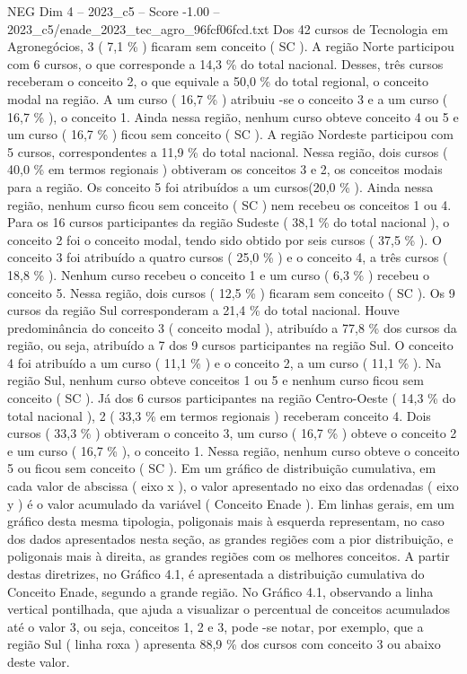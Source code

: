 \begin{textsample}{NEG Dim 4 – 2023\_c5 – Score -1.00 – 2023\_c5/enade\_2023\_tec\_agro\_96fcf06fcd.txt}
Dos 42 cursos de Tecnologia em Agronegócios, 3 ( 7,1 \% ) ficaram sem conceito ( SC ).
A região Norte participou com 6 cursos, o que corresponde a 14,3 \% do total nacional.
Desses, três cursos receberam o conceito 2, o que equivale a 50,0 \% do total regional, o conceito modal na região.
A um curso ( 16,7 \% ) atribuiu -se o conceito 3 e a um curso ( 16,7 \% ), o conceito 1.
Ainda nessa região, nenhum curso obteve conceito 4 ou 5 e um curso ( 16,7 \% ) ficou sem conceito ( SC ).
A região Nordeste participou com 5 cursos, correspondentes a 11,9 \% do total nacional.
Nessa região, dois cursos ( 40,0 \% em termos regionais ) obtiveram os conceitos 3 e 2, os conceitos modais para a região.
Os conceito 5 foi atribuídos a um cursos(20,0 \% ).
Ainda nessa região, nenhum curso ficou sem conceito ( SC ) nem recebeu os conceitos 1 ou 4.
Para os 16 cursos participantes da região Sudeste ( 38,1 \% do total nacional ), o conceito 2 foi o conceito modal, tendo sido obtido por seis cursos ( 37,5 \% ).
O conceito 3 foi atribuído a quatro cursos ( 25,0 \% ) e o conceito 4, a três cursos ( 18,8 \% ).
Nenhum curso recebeu o conceito 1 e um curso ( 6,3 \% ) recebeu o conceito 5.
Nessa região, dois cursos ( 12,5 \% ) ficaram sem conceito ( SC ).
Os 9 cursos da região Sul corresponderam a 21,4 \% do total nacional.
Houve predominância do conceito 3 ( conceito modal ), atribuído a 77,8 \% dos cursos da região, ou seja, atribuído a 7 dos 9 cursos participantes na região Sul.
O conceito 4 foi atribuído a um curso ( 11,1 \% ) e o conceito 2, a um curso ( 11,1 \% ).
Na região Sul, nenhum curso obteve conceitos 1 ou 5 e nenhum curso ficou sem conceito ( SC ).
Já dos 6 cursos participantes na região Centro-Oeste ( 14,3 \% do total nacional ), 2 ( 33,3 \% em termos regionais ) receberam conceito 4.
Dois cursos ( 33,3 \% ) obtiveram o conceito 3, um curso ( 16,7 \% ) obteve o conceito 2 e um curso ( 16,7 \% ), o conceito 1.
Nessa região, nenhum curso obteve o conceito 5 ou ficou sem conceito ( SC ).
Em um gráfico de distribuição cumulativa, em cada valor de abscissa ( eixo x ), o valor apresentado no eixo das ordenadas ( eixo y ) é o valor acumulado da variável ( Conceito Enade ).
Em linhas gerais, em um gráfico desta mesma tipologia, poligonais mais à esquerda representam, no caso dos dados apresentados nesta seção, as grandes regiões com a pior distribuição, e poligonais mais à direita, as grandes regiões com os melhores conceitos.
A partir destas diretrizes, no Gráfico 4.1, é apresentada a distribuição cumulativa do Conceito Enade, segundo a grande região.
No Gráfico 4.1, observando a linha vertical pontilhada, que ajuda a visualizar o percentual de conceitos acumulados até o valor 3, ou seja, conceitos 1, 2 e 3, pode -se notar, por exemplo, que a região Sul ( linha roxa ) apresenta 88,9 \% dos cursos com conceito 3 ou abaixo deste valor.

\end{textsample}
